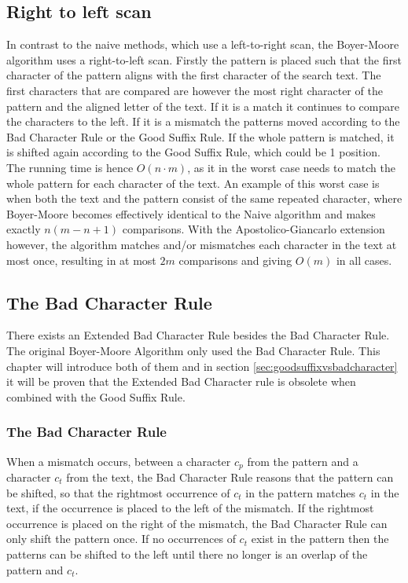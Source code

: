 \subsection{Right to left scan}
In contrast to the naive methods, which use a left-to-right scan, the Boyer-Moore algorithm uses a right-to-left scan. Firstly the pattern is placed such that the first character of the pattern aligns with the first character of the search text. The first characters that are compared are however the most right character of the pattern and the aligned letter of the text. If it is a match it continues to compare the characters to the left. If it is a mismatch the patterns moved according to the Bad Character Rule or the Good Suffix Rule. If the whole pattern is matched, it is shifted again according to the Good Suffix Rule, which could be 1 position. The running time is hence $O(n\cdot m)$, as it in the worst case needs to match the whole pattern for each character of the text. An example of this worst case is when both the text and the pattern consist of the same repeated character, where Boyer-Moore becomes effectively identical to the Naive algorithm and makes exactly $n(m-n+1)$ comparisons. With the Apostolico-Giancarlo extension however, the algorithm matches and/or mismatches each character in the text at most once, resulting in at most $2m$ comparisons and giving $O(m)$ in all cases. 

\subsection{The Bad Character Rule}
There exists an Extended Bad Character Rule besides the Bad Character Rule. The original Boyer-Moore Algorithm only used the Bad Character Rule. This chapter will introduce both of them and in section \ref{sec:goodsuffixvsbadcharacter} it will be proven that the Extended Bad Character rule is obsolete when combined with the Good Suffix Rule. 

\subsubsection{The Bad Character Rule}
When a mismatch occurs, between a character $c_p$ from the pattern and a character $c_t$ from the text, the Bad Character Rule reasons that the pattern can be shifted, so that the rightmost occurrence of $c_t$ in the pattern matches $c_t$ in the text, if the occurrence is placed to the left of the mismatch. If the rightmost occurrence is placed on the right of the mismatch, the Bad Character Rule can only shift the pattern once. If no occurrences of $c_t$ exist in the pattern then the patterns can be shifted to the left until there no longer is an overlap of the pattern and $c_t$. 

